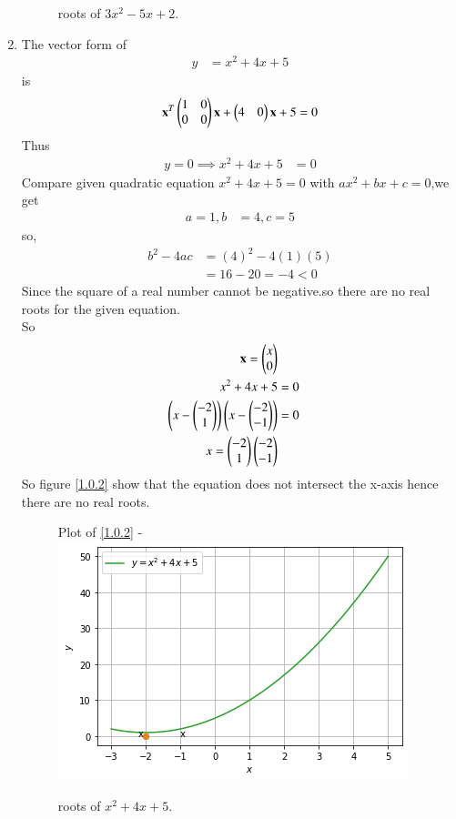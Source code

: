 \documentclass[journal,12pt,twocolumn]{IEEEtran}
\begin{document}
\begin{enumerate}
\begin{figure}[ht!]
    \caption{roots of $3x^2-5x+2$.}
    \label{fig:Roots Of $3x^2-5x+2 &=$.}
\end{figure} 
\item
The vector form of
\begin{align}
y&=x^2+4x+5
\end{align}
is
\begin{align}
\mathbf{x}^T \begin{pmatrix}1 & 0\\0 & 0\end{pmatrix}\mathbf{x}+ \begin{pmatrix}4 & 0\end{pmatrix}\mathbf{x}+5=0
\end{align}
Thus
\begin{align}
y=0\implies x^2+4x+5 &=0
\end{align}
%
Compare given quadratic equation  $x ^2 +4x +5 = 0$ with $ax^2 + bx + c = 0$,we get
\begin{align}
a=1,b&=4,c=5
\end{align}
so,
\begin{align}
b^2-4ac&=(4)^2-4(1)(5)\\
&=16-20=-4<0
\end{align}
Since the square of a real number cannot be negative.so there are no real roots for the given equation.\\
So
\begin{align}
  \mathbf{x}=\begin{pmatrix}x\\0\end{pmatrix}\\
  x^2+4x+5 &=0\\
 \begin{pmatrix} x-\begin{pmatrix}-2\\1\end{pmatrix}\end{pmatrix}\begin{pmatrix}x-\begin{pmatrix}-2\\-1\end{pmatrix}\end{pmatrix} &=0\\
  x=\begin{pmatrix}-2\\1\end{pmatrix}\begin{pmatrix}-2\\-1\end{pmatrix}
\end{align}
So figure \eqref{1.0.2} show that the equation does not intersect the x-axis hence there are no real roots.
\begin{figure}[ht!]
Plot of \eqref{1.0.2} -
    \centering
    \includegraphics[width=\columnwidth]{figure5(2).png}
    \caption{roots of $x^2+4x+5$.}
    \label{fig:Roots Of $x^2+4x+5 &=$.}
\end{figure} 
\end{enumerate}
\end{document}
